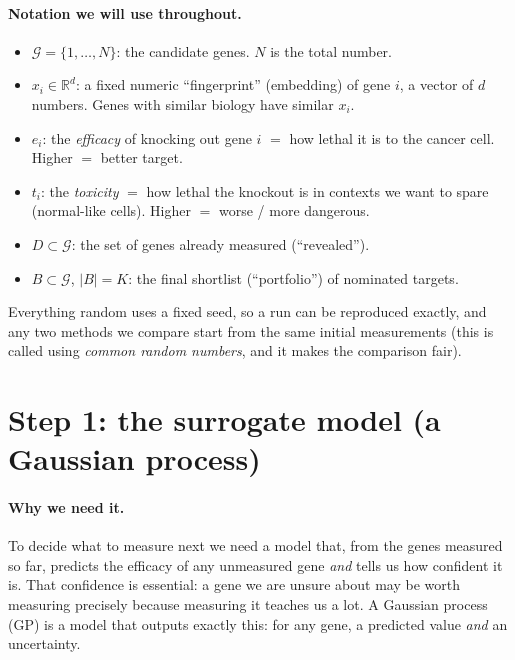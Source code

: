 \documentclass[11pt]{article}
\newcommand{\R}{\mathbb{R}}
\begin{document}
\paragraph{Notation we will use throughout.}
\begin{itemize}[leftmargin=2em,itemsep=1pt]
\item $\mathcal{G}=\{1,\dots,N\}$: the candidate genes. $N$ is the total number.
\item $x_i \in \R^d$: a fixed numeric ``fingerprint'' (embedding) of gene $i$, a vector of
$d$ numbers. Genes with similar biology have similar $x_i$.
\item $e_i$: the \emph{efficacy} of knocking out gene $i$ $=$ how lethal it is to the
cancer cell. Higher $=$ better target.
\item $t_i$: the \emph{toxicity} $=$ how lethal the knockout is in contexts we want to
spare (normal-like cells). Higher $=$ worse / more dangerous.
\item $D \subset \mathcal{G}$: the set of genes already measured (``revealed'').
\item $B \subset \mathcal{G}$, $|B|=K$: the final shortlist (``portfolio'') of nominated targets.
\end{itemize}
Everything random uses a fixed seed, so a run can be reproduced exactly, and any two
methods we compare start from the same initial measurements (this is called using
\emph{common random numbers}, and it makes the comparison fair).

\section{Step 1: the surrogate model (a Gaussian process)}

\paragraph{Why we need it.} To decide what to measure next we need a model that, from the
genes measured so far, predicts the efficacy of any unmeasured gene \emph{and} tells us
how confident it is. That confidence is essential: a gene we are unsure about may be
worth measuring precisely because measuring it teaches us a lot. A Gaussian process (GP)
is a model that outputs exactly this: for any gene, a predicted value \emph{and} an
uncertainty.
\end{document}
